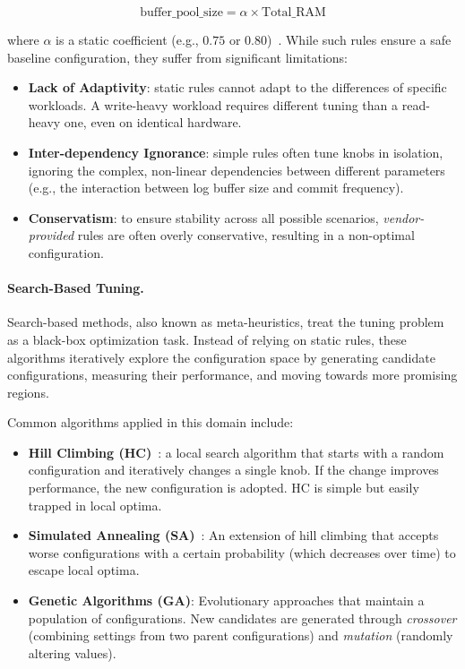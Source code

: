 \[\text{buffer\_pool\_size} = \alpha \times \text{Total\_RAM}\]

where $\alpha$ is a static coefficient (e.g., $0.75$ or $0.80$)~\cite{autotune_survey}.
While such rules ensure a safe baseline configuration, they suffer from significant limitations:
\begin{itemize}
  \item \textbf{Lack of Adaptivity}: static rules cannot adapt to the differences of specific workloads. A write-heavy workload requires different tuning than a read-heavy one, even on identical hardware.
  \item \textbf{Inter-dependency Ignorance}: simple rules often tune knobs in isolation, ignoring the complex, non-linear dependencies between different parameters (e.g., the interaction between log buffer size and commit frequency).
  \item \textbf{Conservatism}: to ensure stability across all possible scenarios, \textit{vendor-provided} rules are often overly conservative, resulting in a non-optimal configuration.
\end{itemize}

\paragraph{Search-Based Tuning.}
Search-based methods, also known as meta-heuristics, treat the tuning problem as a black-box optimization task.
Instead of relying on static rules, these algorithms iteratively explore the configuration space by generating candidate configurations, measuring their performance, and moving towards more promising regions.

Common algorithms applied in this domain include:
\begin{itemize}
  \item \textbf{Hill Climbing (HC)}~\cite{hill_climbing}: a local search algorithm that starts with a random configuration and iteratively changes a single knob. If the change improves performance, the new configuration is adopted. HC is simple but easily trapped in local optima.
  \item \textbf{Simulated Annealing (SA)}~\cite{simulated_annealing}: An extension of hill climbing that accepts worse configurations with a certain probability (which decreases over time) to escape local optima.
  \item \textbf{Genetic Algorithms (GA)}: Evolutionary approaches that maintain a population of configurations. New candidates are generated through \textit{crossover} (combining settings from two parent configurations) and \textit{mutation} (randomly altering values).
\end{itemize}

